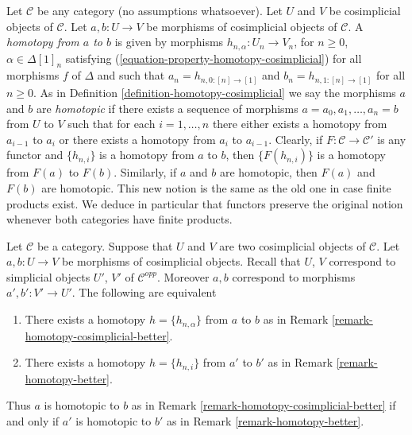 \begin{remark}
\label{remark-homotopy-cosimplicial-better}
Let $\mathcal{C}$ be any category (no assumptions whatsoever). Let
$U$ and $V$ be cosimplicial objects of $\mathcal{C}$. Let $a, b : U \to V$
be morphisms of cosimplicial objects of $\mathcal{C}$. A
{\it homotopy from $a$ to $b$} is given by morphisms
$h_{n, \alpha} : U_n \to V_n$, for $n \geq 0$, $\alpha \in \Delta[1]_n$
satisfying (\ref{equation-property-homotopy-cosimplicial})
for all morphisms $f$ of $\Delta$ and such that
$a_n = h_{n, 0 : [n] \to [1]}$ and $b_n = h_{n, 1 : [n] \to [1]}$
for all $n \geq 0$.
As in Definition \ref{definition-homotopy-cosimplicial}
we say the morphisms $a$ and $b$
are {\it homotopic} if there exists a sequence of morphisms
$a = a_0, a_1, \ldots, a_n = b$ from $U$ to $V$ such that for each
$i = 1, \ldots, n$ there either exists a homotopy from $a_{i - 1}$ to $a_i$
or there exists a homotopy from $a_i$ to $a_{i - 1}$.
Clearly, if $F : \mathcal{C} \to \mathcal{C}'$ is any functor
and $\{h_{n, i}\}$ is a homotopy from $a$ to $b$, then
$\{F(h_{n, i})\}$ is a homotopy from $F(a)$ to $F(b)$.
Similarly, if $a$ and $b$ are homotopic, then $F(a)$ and $F(b)$
are homotopic. This new notion is the same
as the old one in case finite products exist. We deduce
in particular that functors preserve the original notion
whenever both categories have finite products.
\end{remark}

\begin{lemma}
\label{lemma-compare-homotopies}
Let $\mathcal{C}$ be a category. Suppose that $U$ and $V$ are two
cosimplicial objects of $\mathcal{C}$. Let $a, b : U \to V$ be morphisms
of cosimplicial objects. Recall that $U$, $V$ correspond
to simplicial objects $U'$, $V'$ of $\mathcal{C}^{opp}$.
Moreover $a, b$ correspond to morphisms $a', b' : V' \to U'$.
The following are equivalent
\begin{enumerate}
\item There exists a homotopy $h = \{h_{n, \alpha}\}$ from
$a$ to $b$ as in Remark \ref{remark-homotopy-cosimplicial-better}.
\item There exists a homotopy $h = \{h_{n, i}\}$ from $a'$ to $b'$
as in Remark \ref{remark-homotopy-better}.
\end{enumerate}
Thus $a$ is homotopic to $b$ as in
Remark \ref{remark-homotopy-cosimplicial-better}
if and only if $a'$ is homotopic to $b'$ as in
Remark \ref{remark-homotopy-better}.
\end{lemma}

